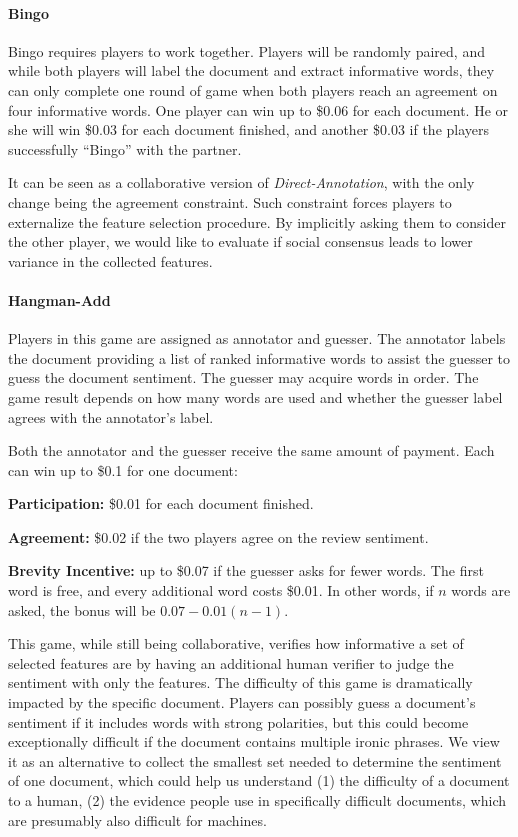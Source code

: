 \documentclass[chi_draft]{sigchi}
\begin{document}
\paragraph{Bingo} 
Bingo requires players to work together. Players will be randomly paired, and while both players will label the document and extract informative words, they can only complete one round of game when both players reach an agreement on four informative words.
One player can win up to \$0.06 for each document.
He or she will win \$0.03 for each document finished, and another \$0.03 if the players successfully ``Bingo'' with the partner.

It can be seen as a collaborative version of \emph{Direct-Annotation}, with the only change being the agreement constraint. 
Such constraint forces players to externalize the feature selection procedure. 
By implicitly asking them to consider the other player, we would like to evaluate if social consensus leads to lower variance in the collected features.

\paragraph{Hangman-Add} 
Players in this game are assigned as annotator and guesser. The annotator labels the document providing a list of ranked informative words to assist the guesser to guess the document sentiment. The guesser may acquire words in order. The game result depends on how many words are used and whether the guesser label agrees with the annotator's label.

Both the annotator and the guesser receive the same amount of payment.
Each can win up to \$0.1 for one document:\begin{compactitem}
	\item \textbf{Participation: } \$0.01 for each document finished.
	\item \textbf{Agreement: } \$0.02 if the two players agree on the review sentiment.
	\item \textbf{Brevity Incentive: } up to \$0.07 if the guesser asks for fewer words. The first word is free, and every additional word costs \$0.01. In other words, if $n$ words are asked, the bonus will be $0.07-0.01(n-1)$.
\end{compactitem}

This game, while still being collaborative, verifies how informative a set of selected features are by having an additional human verifier to judge the sentiment with only the features. 
The difficulty of this game is dramatically impacted by the specific document. 
Players can possibly guess a document's sentiment if it includes words with strong polarities, but this could become exceptionally difficult if the document contains multiple ironic phrases. 
We view it as an alternative to collect the smallest set needed to determine the sentiment of one document, which could help us understand (1) the difficulty of a document to a human, (2) the evidence people use in specifically difficult documents, which are presumably also difficult for machines.
\end{document}
